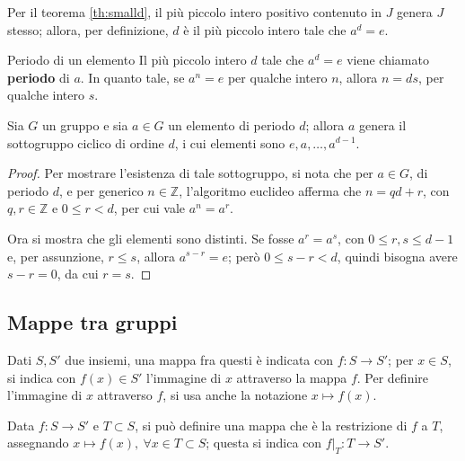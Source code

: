\documentclass[11pt, a4paper]{scrartcl}
\theoremstyle{definition}
\numberwithin{esempio}{section}
\theoremstyle{definition}
\numberwithin{obs}{section}
\numberwithin{nota}{section}
\numberwithin{equation}{subsection}
\begin{document}
Per il teorema \ref{th:smalld}, il pi\`u piccolo intero positivo contenuto in $J$ genera $J$ stesso;
allora, per definizione, $d$ \`e il pi\`u piccolo intero tale che $a^d = e$. 
\begin{definizione}
	{Periodo di un elemento}{}
Il pi\`u piccolo intero $d$ tale che $a^d = e$ viene chiamato \textbf{periodo} di $a$. 
In quanto tale, se $a^n = e$ per qualche intero $n$, allora $n = ds$, per qualche intero $s$.
\end{definizione}
\begin{teorema}
	{}{}
	Sia $G$ un gruppo e sia $a \in G$ un elemento di periodo $d$; allora $a$ genera il sottogruppo ciclico di ordine $d$, i cui elementi sono $e, a , \ldots, a^{d-1} $.
	\begin{proof}
	Per mostrare l'esistenza di tale sottogruppo, si nota che per $a \in G$, di periodo $d$, e per generico $n \in \mathbb{Z}$, l'algoritmo euclideo afferma che $n = qd +r $, con $q,r \in \mathbb{Z}$ e $0\le r < d$, per cui vale $a^n = a^r$.

	Ora si mostra che gli elementi sono distinti.
	Se fosse $a^r = a^s$, con $0\le r ,s\le d-1$ e, per assunzione, $r\le s$, allora $a^{s-r} = e $; per\`o $0\le  s-r < d$, quindi bisogna avere $s-r=0$, da cui $r=s$.
	\end{proof}
\end{teorema}
\subsection{Mappe tra gruppi}
Dati $S , S' $ due insiemi, una mappa fra questi \`e indicata con $f: S \to S'$; per $x \in S$, si indica con $f(x) \in S'$ l'immagine di $x$ attraverso la mappa $f$.
Per definire l'immagine di $x$ attraverso $f$, si usa anche la notazione $x \mapsto f(x)$.

Data $f:S \to S'$ e $T \subset S$, si pu\`o definire una mappa che \`e la restrizione di $f$ a $T$, assegnando $x \mapsto f(x), \ \forall x \in T \subset S$; questa si indica con $f|_T : T \to S'$.
\end{document}
